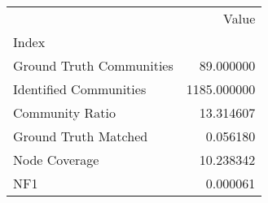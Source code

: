 \begin{tabular}{lr}
\toprule
{} &        Value \\
Index                    &              \\
\midrule
Ground Truth Communities &    89.000000 \\
Identified Communities   &  1185.000000 \\
Community Ratio          &    13.314607 \\
Ground Truth Matched     &     0.056180 \\
Node Coverage            &    10.238342 \\
NF1                      &     0.000061 \\
\bottomrule
\end{tabular}
